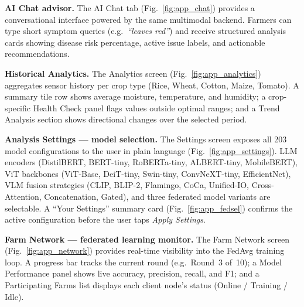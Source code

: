 \documentclass[conference]{IEEEtran}
\begin{document}
\textbf{AI Chat advisor.}
The AI Chat tab (Fig.~\ref{fig:app_chat}) provides a conversational interface
powered by the same multimodal backend.  Farmers can type short symptom queries
(e.g.\ \emph{``leaves red''}) and receive structured analysis cards showing
disease risk percentage, active issue labels, and actionable recommendations.

\textbf{Historical Analytics.}
The Analytics screen (Fig.~\ref{fig:app_analytics}) aggregates sensor history
per crop type (Rice, Wheat, Cotton, Maize, Tomato).  A summary tile row shows
average moisture, temperature, and humidity; a crop-specific Health Check panel
flags values outside optimal ranges; and a Trend Analysis section shows
directional changes over the selected period.

\textbf{Analysis Settings — model selection.}
The Settings screen exposes all 203 model configurations to the user in plain
language (Fig.~\ref{fig:app_settings}).  LLM encoders (DistilBERT, BERT-tiny,
RoBERTa-tiny, ALBERT-tiny, MobileBERT), ViT backbones (ViT-Base, DeiT-tiny,
Swin-tiny, ConvNeXT-tiny, EfficientNet), VLM fusion strategies (CLIP, BLIP-2,
Flamingo, CoCa, Unified-IO, Cross-Attention, Concatenation, Gated), and three
federated model variants are selectable.  A ``Your Settings'' summary card
(Fig.~\ref{fig:app_fedsel}) confirms the active configuration before the user
taps \emph{Apply Settings}.

\textbf{Farm Network — federated learning monitor.}
The Farm Network screen (Fig.~\ref{fig:app_network}) provides real-time
visibility into the FedAvg training loop.  A progress bar tracks the current
round (e.g.\ Round~3 of~10); a Model Performance panel shows live accuracy,
precision, recall, and F1; and a Participating Farms list displays each client
node's status (Online / Training / Idle).
\end{document}
